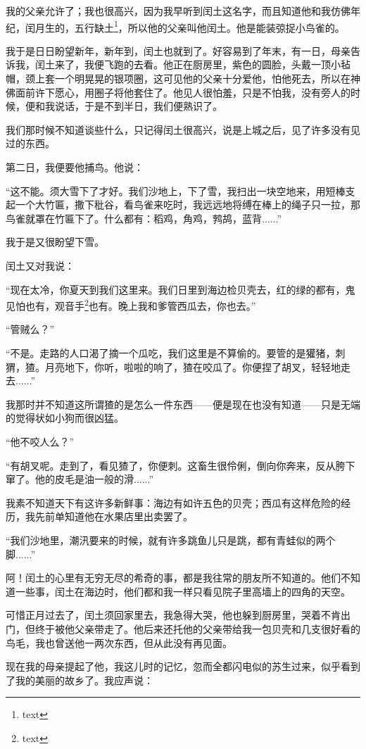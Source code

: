 \documentclass[12pt,UTF8]{ctexbook}
\begin{document}
我的父亲允许了；我也很高兴，因为我早听到闰土这名字，而且知道他和我仿佛年纪，闰月生的，五行缺土\footnote{text}，所以他的父亲叫他闰土。他是能装弶捉小鸟雀的。

我于是日日盼望新年，新年到，闰土也就到了。好容易到了年末，有一日，母亲告诉我，闰土来了，我便飞跑的去看。他正在厨房里，紫色的圆脸，头戴一顶小毡帽，颈上套一个明晃晃的银项圈，这可见他的父亲十分爱他，怕他死去，所以在神佛面前许下愿心，用圈子将他套住了。他见人很怕羞，只是不怕我，没有旁人的时候，便和我说话，于是不到半日，我们便熟识了。

我们那时候不知道谈些什么，只记得闰土很高兴，说是上城之后，见了许多没有见过的东西。

第二日，我便要他捕鸟。他说：

“这不能。须大雪下了才好。我们沙地上，下了雪，我扫出一块空地来，用短棒支起一个大竹匾，撒下秕谷，看鸟雀来吃时，我远远地将缚在棒上的绳子只一拉，那鸟雀就罩在竹匾下了。什么都有：稻鸡，角鸡，鹁鸪，蓝背......”

我于是又很盼望下雪。

闰土又对我说：

“现在太冷，你夏天到我们这里来。我们日里到海边检贝壳去，红的绿的都有，鬼见怕也有，观音手\footnote{text}也有。晚上我和爹管西瓜去，你也去。”

“管贼么？”

“不是。走路的人口渴了摘一个瓜吃，我们这里是不算偷的。要管的是獾猪，刺猬，猹。月亮地下，你听，啦啦的响了，猹在咬瓜了。你便捏了胡叉，轻轻地走去......”

我那时并不知道这所谓猹的是怎么一件东西——便是现在也没有知道——只是无端的觉得状如小狗而很凶猛。

“他不咬人么？”

“有胡叉呢。走到了，看见猹了，你便刺。这畜生很伶俐，倒向你奔来，反从胯下窜了。他的皮毛是油一般的滑......”

我素不知道天下有这许多新鲜事：海边有如许五色的贝壳；西瓜有这样危险的经历，我先前单知道他在水果店里出卖罢了。

“我们沙地里，潮汛要来的时候，就有许多跳鱼儿只是跳，都有青蛙似的两个脚......”

阿！闰土的心里有无穷无尽的希奇的事，都是我往常的朋友所不知道的。他们不知道一些事，闰土在海边时，他们都和我一样只看见院子里高墙上的四角的天空。

可惜正月过去了，闰土须回家里去，我急得大哭，他也躲到厨房里，哭着不肯出门，但终于被他父亲带走了。他后来还托他的父亲带给我一包贝壳和几支很好看的鸟毛，我也曾送他一两次东西，但从此没有再见面。

现在我的母亲提起了他，我这儿时的记忆，忽而全都闪电似的苏生过来，似乎看到了我的美丽的故乡了。我应声说：
\end{document}
